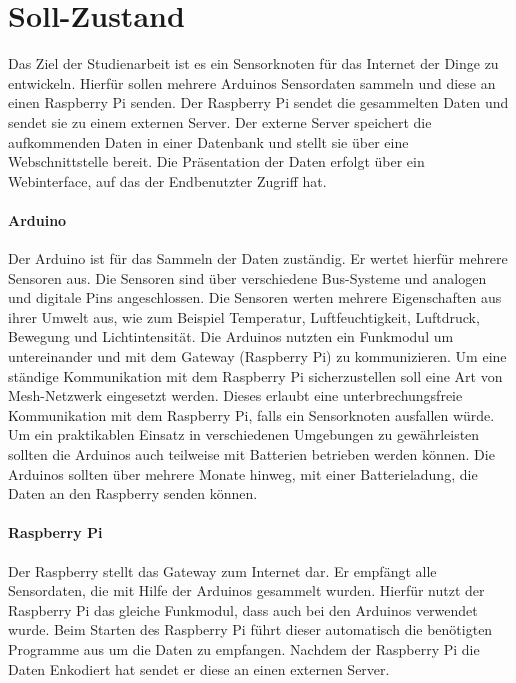 \section{Soll-Zustand}
Das Ziel der Studienarbeit ist es ein Sensorknoten für das Internet der Dinge zu entwickeln. Hierfür sollen mehrere Arduinos Sensordaten sammeln und diese an einen Raspberry Pi senden. Der Raspberry Pi sendet die gesammelten Daten und sendet sie zu einem externen Server. Der externe Server speichert die aufkommenden Daten in einer Datenbank und stellt sie über eine Webschnittstelle bereit. Die Präsentation der Daten erfolgt über ein Webinterface, auf das der Endbenutzter Zugriff hat. 
\paragraph{Arduino} Der Arduino ist für das Sammeln der Daten zuständig. Er wertet hierfür mehrere Sensoren aus. Die Sensoren sind über verschiedene Bus-Systeme und analogen und digitale Pins angeschlossen. Die Sensoren werten mehrere Eigenschaften aus ihrer Umwelt aus, wie zum Beispiel Temperatur, Luftfeuchtigkeit, Luftdruck, Bewegung und Lichtintensität. 
Die Arduinos nutzten ein Funkmodul um untereinander und mit dem Gateway (Raspberry Pi) zu kommunizieren. Um eine ständige Kommunikation mit dem Raspberry Pi sicherzustellen soll eine Art von Mesh-Netzwerk eingesetzt werden. Dieses erlaubt eine unterbrechungsfreie Kommunikation mit dem Raspberry Pi, falls ein Sensorknoten ausfallen würde.
Um ein praktikablen Einsatz in verschiedenen Umgebungen zu gewährleisten sollten die Arduinos auch teilweise mit Batterien betrieben werden können. Die Arduinos sollten über mehrere Monate hinweg, mit einer Batterieladung, die Daten an den Raspberry senden können.
\paragraph{Raspberry Pi}
Der Raspberry stellt das Gateway zum Internet dar. Er empfängt alle Sensordaten, die mit Hilfe der Arduinos gesammelt wurden. Hierfür nutzt der Raspberry Pi das gleiche Funkmodul, dass auch bei den Arduinos verwendet wurde. Beim Starten des Raspberry Pi führt dieser automatisch die benötigten Programme aus um die Daten zu empfangen. Nachdem der Raspberry Pi die Daten Enkodiert hat sendet er diese an einen externen Server.
